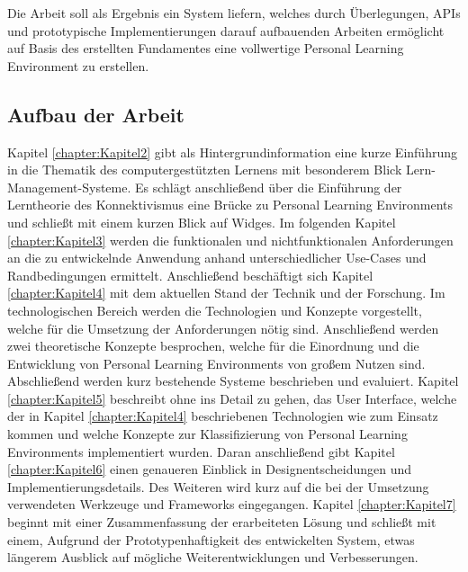 Die Arbeit soll als Ergebnis ein System liefern, welches durch Überlegungen, APIs und prototypische Implementierungen darauf aufbauenden Arbeiten ermöglicht auf Basis des erstellten Fundamentes eine vollwertige Personal Learning Environment zu erstellen.

\subsection{Aufbau der Arbeit}
Kapitel \ref{chapter:Kapitel2} gibt als Hintergrundinformation eine kurze Einführung in die Thematik des computergestützten Lernens mit besonderem Blick Lern-Management-Systeme. Es schlägt anschließend über die Einführung der Lerntheorie des Konnektivismus eine Brücke zu Personal Learning Environments und schließt mit einem kurzen Blick auf Widges. Im folgenden Kapitel \ref{chapter:Kapitel3} werden die funktionalen und nichtfunktionalen Anforderungen an die zu entwickelnde Anwendung anhand unterschiedlicher Use-Cases und Randbedingungen ermittelt. Anschließend beschäftigt sich Kapitel \ref{chapter:Kapitel4} mit dem aktuellen Stand der Technik und der Forschung. Im technologischen Bereich werden die Technologien und Konzepte vorgestellt, welche für die Umsetzung der Anforderungen nötig sind. Anschließend werden zwei theoretische Konzepte besprochen, welche für die Einordnung und die Entwicklung von Personal Learning Environments von großem Nutzen sind. Abschließend werden kurz bestehende Systeme beschrieben und evaluiert. Kapitel \ref{chapter:Kapitel5} beschreibt ohne ins Detail zu gehen, das User Interface, welche der in Kapitel \ref{chapter:Kapitel4} beschriebenen Technologien wie zum Einsatz kommen und welche Konzepte zur Klassifizierung von Personal Learning Environments implementiert wurden. Daran anschließend gibt Kapitel \ref{chapter:Kapitel6} einen genaueren Einblick in Designentscheidungen und Implementierungsdetails. Des Weiteren wird kurz auf die bei der Umsetzung verwendeten Werkzeuge und Frameworks eingegangen. Kapitel \ref{chapter:Kapitel7} beginnt mit einer Zusammenfassung der erarbeiteten Lösung und schließt mit einem, Aufgrund der Prototypenhaftigkeit des entwickelten System, etwas längerem Ausblick auf mögliche Weiterentwicklungen und Verbesserungen.
